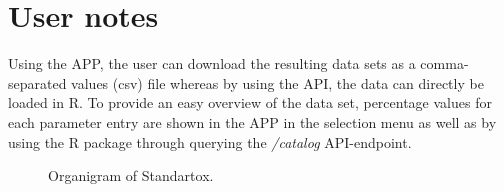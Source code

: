 \section{User notes}


Using the APP, the user can download the resulting data sets as a comma-separated values (csv) file whereas by using the API, the data can directly be loaded in R.  To provide an easy overview of the data set, percentage values for each parameter entry are shown in the APP in the selection menu as well as by using the R package through querying the \textit{/catalog} API-endpoint.



\pagebreak

\begin{figure}
    
    \caption{Organigram of Standartox.}
    \label{fig:stx-organigram}
\end{figure}


